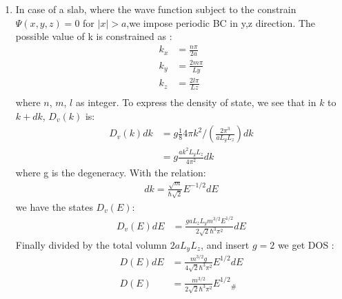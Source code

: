 \documentclass[notitlepage]{revtex4-1}
\begin{document}
\begin{CJK}{UTF8}{bsmi}
\begin{enumerate}
\begin{enumerate}[label=(\alph*)]
		\item In case of a slab, where the wave function subject to the constrain $\Psi(x,y,z)=0$ for $|x|>a$,we impose periodic BC in y,z direction. The possible value of k is constrained as :
		\begin{align*}
			k_x &= \frac{n\pi}{2a} \\
			k_y &= \frac{2m\pi}{Ly} \\
			k_z &= \frac{2l\pi}{Lz} \\
		\end{align*} 
		where $n$, $m$, $l$ as integer. To express the density of state, we see that in $k$ to $k+dk$, $D_v(k)$ is:
		\begin{align*}
		D_v(k)dk &= g\frac{1}{8} 4\pi k^2 / (\frac{2\pi^3}{aL_yL_z}) dk \\
				 &= g\frac{ak^2L_yL_z}{4\pi^2} dk
		\end{align*} 
		where g is the degeneracy. With the relation:
		\begin{align*}
		dk = \frac{\sqrt{m}}{\hbar\sqrt{2}}E^{-1/2} dE  
		\end{align*} 			
		we have the states $D_v(E)$:
		\begin{align*}
		D_v(E)dE &= \frac{gaL_zL_y m^{3/2} E^{1/2}}{2\sqrt{2}\hbar^3\pi^2} dE 
		\end{align*} 		
		Finally divided by the total volumn $2aL_yL_z$, and insert $g=2$ we get DOS :
		\begin{align*}
		D(E)dE  &= \frac{m^{3/2}g}{4\sqrt{2}\hbar^3\pi^2} E^{1/2} dE \\
		D(E)    &= \frac{m^{3/2}}{2\sqrt{2}\hbar^3\pi^2} {E^{1/2}}_{\#}
		\end{align*} 		
	\end{enumerate}
	
\end{enumerate}






	
\end{CJK}
\end{document}
